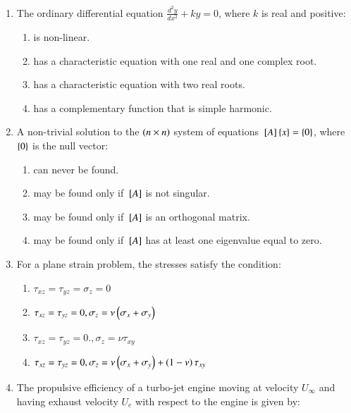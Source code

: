 \documentclass[journal,12pt,onecolumn]{IEEEtran}
\theoremstyle{remark}
\begin{document}
\begin{enumerate}
\begin{enumerate}
\end{enumerate}
\item The ordinary differential equation $\frac{d^2y}{dx^2}+ky=0$, where $k$ is real and positive:
\begin{enumerate}
\item is non-linear.
\item has a characteristic equation with one real and one complex root.
\item has a characteristic equation with two real roots.
\item has a complementary function that is simple harmonic.
\end{enumerate}
\item A non-trivial solution to the $\left(n\times n\right)$ system of equations ${}\left[A\right]\left\{x\right\} = \left\{0\right\}$, where $\left\{0\right\}$ is the null vector:
\begin{enumerate}
\item can never be found.
\item may be found only if ${}\left[A\right]$ is not singular.
\item may be found only if ${}\left[A\right]$ is an orthogonal matrix.
\item may be found only if ${}\left[A\right]$ has at least one eigenvalue equal to zero.
\end{enumerate}
\item For a plane strain problem, the stresses satisfy the condition:
\begin{enumerate}
\item $\tau_{xz}=\tau_{yz}=\sigma_z=0$
\item $\tau_{xz}=\tau_{yz}=0,\sigma_z=\nu\left(\sigma_x+\sigma_y\right)$
\item $\tau_{xz}=\tau_{yz}=0.,\sigma_z=\nu\tau_{xy}$
\item $\tau_{xz}=\tau_{yz}=0,\sigma_z=\nu\left(\sigma_x+\sigma_y\right)+\left(1-\nu\right)\tau_{xy}$
\end{enumerate}
\item The propulsive efficiency of a turbo-jet engine moving at velocity $U_\infty$ and having exhaust velocity $U_e$ with respect to the engine is given by:
\begin{enumerate}

\end{enumerate}
\end{enumerate}
\end{document}
